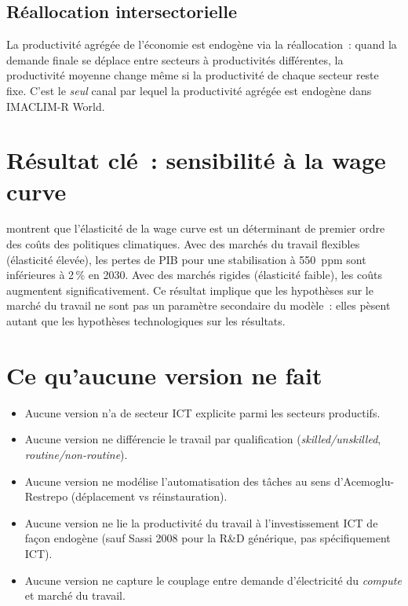 \subsection{Réallocation intersectorielle}

La productivité agrégée de l'économie est endogène via la réallocation~: quand la demande finale se déplace entre secteurs à productivités différentes, la productivité moyenne change même si la productivité de chaque secteur reste fixe. C'est le \emph{seul} canal par lequel la productivité agrégée est endogène dans IMACLIM-R World.

\section{Résultat clé~: sensibilité à la wage curve}

\textcite{guivarch_reducing_2011} montrent que l'élasticité de la wage curve est un déterminant de premier ordre des coûts des politiques climatiques. Avec des marchés du travail flexibles (élasticité élevée), les pertes de PIB pour une stabilisation à 550~ppm sont inférieures à 2\,\% en 2030. Avec des marchés rigides (élasticité faible), les coûts augmentent significativement. Ce résultat implique que les hypothèses sur le marché du travail ne sont pas un paramètre secondaire du modèle~: elles pèsent autant que les hypothèses technologiques sur les résultats.

\section{Ce qu'aucune version ne fait}

\begin{itemize}
\item Aucune version n'a de secteur ICT explicite parmi les secteurs productifs.
\item Aucune version ne différencie le travail par qualification (\emph{skilled/unskilled}, \emph{routine/non-routine}).
\item Aucune version ne modélise l'automatisation des tâches au sens d'Acemoglu-Restrepo (déplacement vs réinstauration).
\item Aucune version ne lie la productivité du travail à l'investissement ICT de façon endogène (sauf Sassi 2008 pour la R\&D générique, pas spécifiquement ICT).
\item Aucune version ne capture le couplage entre demande d'électricité du \emph{compute} et marché du travail.
\end{itemize}
